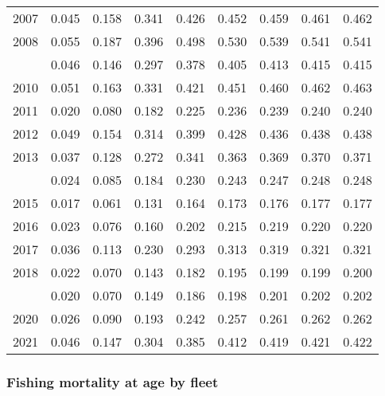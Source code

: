 \documentclass[
]{article}
\begin{document}
\begin{longtable}[t]{lrrrrrrrr}
2007 & 0.045 & 0.158 & 0.341 & 0.426 & 0.452 & 0.459 & 0.461 & 0.462\\
2008 & 0.055 & 0.187 & 0.396 & 0.498 & 0.530 & 0.539 & 0.541 & 0.541\\
\addlinespace
2009 & 0.046 & 0.146 & 0.297 & 0.378 & 0.405 & 0.413 & 0.415 & 0.415\\
2010 & 0.051 & 0.163 & 0.331 & 0.421 & 0.451 & 0.460 & 0.462 & 0.463\\
2011 & 0.020 & 0.080 & 0.182 & 0.225 & 0.236 & 0.239 & 0.240 & 0.240\\
2012 & 0.049 & 0.154 & 0.314 & 0.399 & 0.428 & 0.436 & 0.438 & 0.438\\
2013 & 0.037 & 0.128 & 0.272 & 0.341 & 0.363 & 0.369 & 0.370 & 0.371\\
\addlinespace
2014 & 0.024 & 0.085 & 0.184 & 0.230 & 0.243 & 0.247 & 0.248 & 0.248\\
2015 & 0.017 & 0.061 & 0.131 & 0.164 & 0.173 & 0.176 & 0.177 & 0.177\\
2016 & 0.023 & 0.076 & 0.160 & 0.202 & 0.215 & 0.219 & 0.220 & 0.220\\
2017 & 0.036 & 0.113 & 0.230 & 0.293 & 0.313 & 0.319 & 0.321 & 0.321\\
2018 & 0.022 & 0.070 & 0.143 & 0.182 & 0.195 & 0.199 & 0.199 & 0.200\\
\addlinespace
2019 & 0.020 & 0.070 & 0.149 & 0.186 & 0.198 & 0.201 & 0.202 & 0.202\\
2020 & 0.026 & 0.090 & 0.193 & 0.242 & 0.257 & 0.261 & 0.262 & 0.262\\
2021 & 0.046 & 0.147 & 0.304 & 0.385 & 0.412 & 0.419 & 0.421 & 0.422\\*
\end{longtable}

\hypertarget{fishing-mortality-at-age-by-fleet}{%
\subsubsection{Fishing mortality at age by
fleet}\label{fishing-mortality-at-age-by-fleet}}
\end{document}
